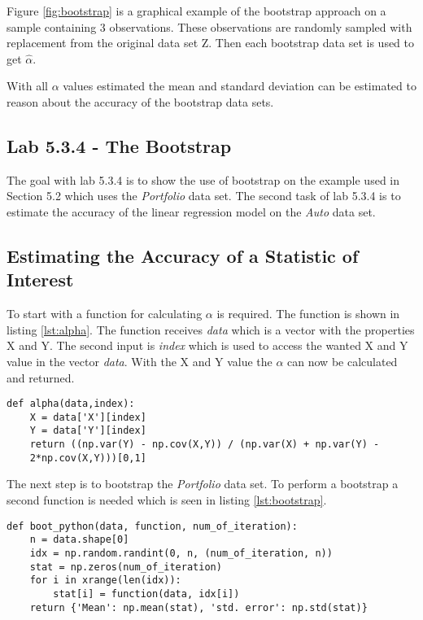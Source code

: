 
Figure \ref{fig:bootstrap} is a graphical example of the bootstrap approach on a sample containing 3 observations. These observations are randomly sampled with replacement from the original data set Z. Then each bootstrap data set is used to get $\hat{\alpha}$.

With all $\alpha$ values estimated the mean and standard deviation can be estimated to reason about the accuracy of the bootstrap data sets.

\subsection{Lab 5.3.4 - The Bootstrap}

The goal with lab 5.3.4 is to show the use of bootstrap on the example used in Section 5.2\citep{ISLR} which uses the \emph{Portfolio} data set. The second task of lab 5.3.4 is to estimate the accuracy of the linear regression model on the \emph{Auto} data set.

\subsection{Estimating the Accuracy of a Statistic of Interest}

To start with a function for calculating $\alpha$ is required. The function is shown in listing \ref{lst:alpha}. The function receives \emph{data} which is a vector with the properties X and Y. The second input is \emph{index} which is used to access the wanted X and Y value in the vector \emph{data}.
With the X and Y value the $\alpha$ can now be calculated and returned.

\begin{lstlisting}[caption={Function for calculating $\alpha$ in python}, label=lst:alpha, mathescape=true]
def alpha(data,index):
	X = data['X'][index]
	Y = data['Y'][index]
	return ((np.var(Y) - np.cov(X,Y)) / (np.var(X) + np.var(Y) - 
	2*np.cov(X,Y)))[0,1]
\end{lstlisting}

The next step is to bootstrap the \emph{Portfolio} data set.
To perform a bootstrap a second function is needed which is seen in listing \ref{lst:bootstrap}.

\begin{lstlisting}[caption={Bootstrap function in python}, label=lst:bootstrap, mathescape=true]
def boot_python(data, function, num_of_iteration):
	n = data.shape[0]
	idx = np.random.randint(0, n, (num_of_iteration, n))
	stat = np.zeros(num_of_iteration)
	for i in xrange(len(idx)):
		stat[i] = function(data, idx[i])
	return {'Mean': np.mean(stat), 'std. error': np.std(stat)}
\end{lstlisting}

